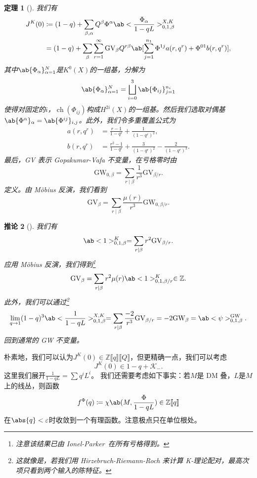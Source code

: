 \documentclass{amsart}
\newtheorem{thm}{定理}[section]
\newtheorem{cor}[thm]{推论}
\theoremstyle{definition}
\theoremstyle{remark}
\theoremstyle{plain}
\theoremstyle{definition}
\theoremstyle{remark}
\newcommand{\Z}{\mathbb{Z}}
\newcommand{\ep}{\varepsilon}
\newcommand{\mc}[1]{\mathcal{#1}}
\newcommand{\mr}[1]{\mathrm{#1}}
\newcommand{\1}{\mathbf{1}}
\newcommand{\2}{\mathbf{2}}
\newcommand{\3}{\mathbf{3}}
\newcommand{\ps}[1]{\llbracket #1 \rrbracket}
\DeclareMathOperator{\ch}{ch}
\begin{document}
\begin{thm}[{\cite{ChouLee2025}}]
    我们有
    \begin{align*}
        J^K(0) &\coloneqq (1-q) + \sum_{\beta, \alpha} Q^{\beta} \Phi^{\alpha} \ab<\frac{\Phi_{\alpha}}{1-qL}>_{0,1,\beta}^{X,K} \\
        &= (1-q) + \sum_{\beta} \sum_{r=1}^{\infty} \mr{GV}_{\beta} Q^{r\beta} \ab[\sum_{j=1}^{n_1} \Phi^{1j} a(r, q^r) + \Phi^{01} b(r, q^r)],
    \end{align*}
    其中\(\ab\{\Phi_{\alpha}\}_{\alpha=1}^N\)是\(K^0(X)\)的一组基，分解为
    \[ \ab\{\Phi_{\alpha}\}_{\alpha=1}^N = \bigsqcup_{i=0}^3 \ab\{\Phi_{ij}\}_{j=1}^{n_i} \]
    使得对固定的\(i\)，\(\ch(\Phi_{ij})\)构成\(H^{2i}(X)\)的一组基。然后我们选取对偶基\(\ab\{\Phi^{\alpha}\}_{\alpha} = \ab\{\Phi^{ij}\}_{i,j}\)。此外，我们令多重覆盖公式为
    \begin{align*}
        a(r, q^r) &= \frac{r-1}{1-q^r} + \frac{1}{(1-q^r)^2}, \\
        b(r, q^r) &= \frac{r^2-1}{1-q^r} + \frac{3}{(1-q^r)^2} - \frac{2}{(1-q^r)^3}.
    \end{align*}
    最后，GV 表示 Gopakumar-Vafa 不变量，在亏格零时由
    \[ \mr{GW}_{0,\beta} = \sum_{r \mid \beta} \frac{1}{r^3} \mr{GV}_{\beta/r}. \]
    定义。由 M\"obius 反演，我们看到
    \[ \mr{GV}_{\beta} = \sum_{r \mid \beta} \frac{\mu(r)}{r^3} \mr{GW}_{0,\beta/r}. \]
\end{thm}

\begin{cor}[{\cite{ChouLee2025}}]
    我们有
    \[ \ab<1>_{0,1,\beta}^K = \sum_{r \mid \beta} r^2 \mr{GV}_{\beta/r}. \]
    应用 M\"obius 反演，我们得到\footnote{注意该结果已由 Ionel-Parker~\cite{IonelParker2018}在所有亏格得到。}
    \[ \mr{GV}_{\beta} = \sum_{r \mid \beta} r^2 \mu(r) \ab<1>_{0,1,\beta/r}^K \in \Z. \]
    此外，我们可以通过\footnote{这就像是，若我们用 Hirzebruch-Riemann-Roch 来计算 K-理论配对，最高次项只看到两个输入的陈特征。}
    \[ \lim_{q \to 1} (1-q)^3 \ab<\frac{1}{1-qL}>_{0,1,\beta}^{X,K} = \sum_{r \mid \beta} \frac{-2}{r^3} \mr{GV}_{\beta/r} = -2 \mr{GW}_{\beta} = \ab<\psi>_{0,1,\beta}^{\mr{GW}}. \]
    回到通常的 GW 不变量。
\end{cor}

朴素地，我们可以认为\(J^K(0) \in \Z\ps{q}\ps{Q}\)，但更精确一点，我们可以考虑
\[ J^K(0) \in 1-q + \mc{K}_-. \]
这里我们展开\(\frac{1}{1-qL} = \sum q^i L^i\)。
我们还需要考虑如下事实：若\(M\)是 DM 叠，\(L\)是\(M\)上的线丛，则函数
\[ f^{\Phi}(q) \coloneqq \chi\ab(M, \frac{\Phi}{1-qL}) \in \Z \ps{q} \]
在\(\abs{q} < \ep\)时收敛到一个有理函数。注意极点只在单位根处。
\end{document}
